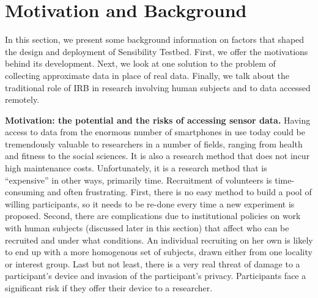 \section{Motivation and Background}\label{sec-motivation}

In this section, we present some background information on 
factors that shaped the design and deployment of 
Sensibility Testbed. First, we offer the motivations behind its 
development. 
Next, we look at one solution to the problem of collecting approximate 
data in place of real data. Finally, we talk about 
the traditional role of IRB in research involving human subjects 
and to data accessed remotely. 

\textbf{Motivation: the potential and the risks of accessing sensor data.}
Having access to data from the enormous number of smartphones 
in use today could be tremendously valuable to researchers in a 
number of fields, ranging from health and fitness to the social sciences. 
It is also a research method that does not incur high maintenance costs. 
Unfortunately, it is a research method that is ``expensive'' in other ways, 
primarily time. Recruitment of volunteers is time-consuming and often 
frustrating. %
First, there is no easy method to build a pool of willing participants, 
so it needs to be re-done every time a new experiment is proposed. 
Second, there are complications due to institutional policies on work 
with human subjects (discussed later in this section) that affect who 
can be recruited and under what conditions. An individual recruiting 
on her own is likely to end up with a more homogenous set of subjects, 
drawn either from one locality or interest group. Last but not least, there 
is a very real threat of damage to a participant's device and invasion 
of the participant's privacy. Participants face a significant risk if 
they offer their device to a researcher.

